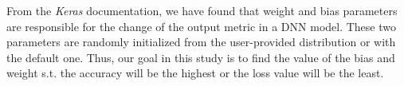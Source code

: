 %


From the \emph{Keras} documentation, we have found that weight and bias parameters are responsible for the change of the output metric in a DNN model. These two parameters are randomly initialized from the user-provided distribution or with the default one. Thus, our goal in this study is to find the value of the bias and weight s.t. the accuracy will be the highest or the loss value will be the least. 
